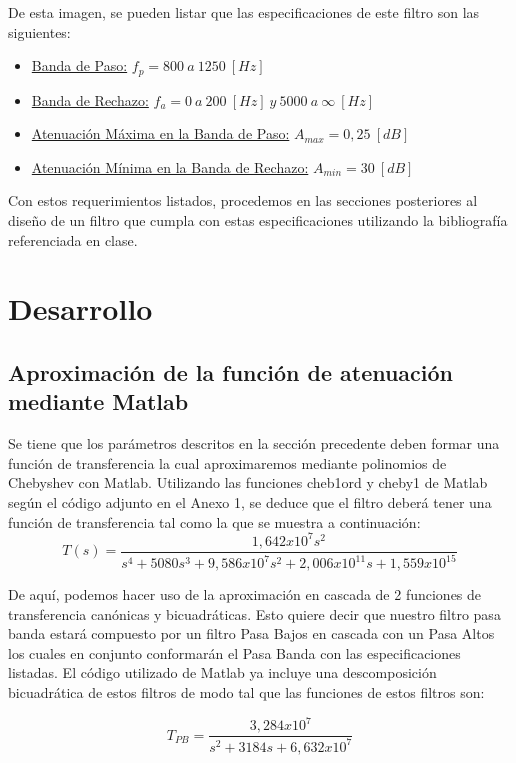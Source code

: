 \documentclass[12pt,a4paper]{article}
\begin{document}
De esta imagen, se pueden listar que las especificaciones de este filtro son las siguientes:
\begin{itemize}
    \item \underline{Banda de Paso:} $f_p = 800 \ a \ 1250 \ [Hz]$
    \item \underline{Banda de Rechazo:} $f_a = 0 \ a \ 200 \ [Hz] \ y \ 5000 \ a \ \infty \ [Hz]$
    \item \underline{Atenuación Máxima en la Banda de Paso:} $A_{max}= 0,25 \ [dB]$
    \item \underline{Atenuación Mínima en la Banda de Rechazo:} $A_{min} = 30 \ [dB]$
\end{itemize}

Con estos requerimientos listados, procedemos en las secciones posteriores al diseño de un filtro que cumpla con estas especificaciones utilizando la bibliografía referenciada en clase.



\section{Desarrollo}
\subsection{Aproximación de la función de atenuación mediante Matlab}
Se tiene que los parámetros descritos en la sección precedente deben formar una función de transferencia la cual aproximaremos mediante polinomios de Chebyshev con Matlab. Utilizando las funciones cheb1ord y cheby1 de Matlab según el código adjunto en el Anexo 1, se deduce que el filtro deberá tener una función de transferencia tal como la que se muestra a continuación: 
\begin{equation}
    \label{eq_1}
    T(s)= \frac{1,642x10^7 s^2}{s^4 + 5080 s^3 + 9,586x10^7 s^2 + 2,006x10^{11} s + 1,559x10^{15}}
\end{equation}

De aquí, podemos hacer uso de la aproximación en cascada de 2 funciones de transferencia canónicas y bicuadráticas. Esto quiere decir que nuestro filtro pasa banda estará compuesto por un filtro Pasa Bajos en cascada con un Pasa Altos los cuales en conjunto conformarán el Pasa Banda con las especificaciones listadas. El código utilizado de Matlab ya incluye una descomposición bicuadrática de estos filtros de modo tal que las funciones de estos filtros son:

\begin{equation}
    \label{eq_2}
    T_{PB} = \frac{3,284x10^{7}}{s^2 + 3184s + 6,632x10^{7}}
\end{equation}
\end{document}
